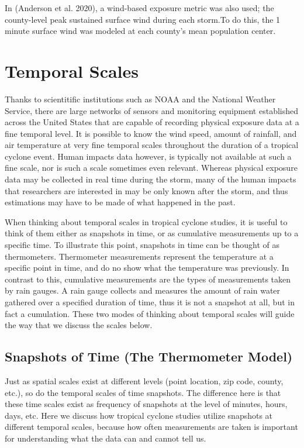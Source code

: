 \documentclass[
]{article}
\begin{document}
In (Anderson et al. 2020), a wind-based exposure metric was also used;
the county-level peak sustained surface wind during each storm.To do
this, the 1 minute surface wind was modeled at each county's mean
population center.

\hypertarget{temporal-scales}{%
\section{Temporal Scales}\label{temporal-scales}}

Thanks to scientitific institutions such as NOAA and the National
Weather Service, there are large networks of sensors and monitoring
equipment established across the United States that are capable of
recording physical exposure data at a fine temporal level. It is
possible to know the wind speed, amount of rainfall, and air temperature
at very fine temporal scales throughout the duration of a tropical
cyclone event. Human impacts data however, is typically not available at
such a fine scale, nor is such a scale sometimes even relevant. Whereas
physical exposure data may be collected in real time during the storm,
many of the human impacts that researchers are interested in may be only
known after the storm, and thus estimations may have to be made of what
happened in the past.

When thinking about temporal scales in tropical cyclone studies, it is
useful to think of them either as snapshots in time, or as cumulative
measurements up to a specific time. To illustrate this point, snapshots
in time can be thought of as thermometers. Thermometer measurements
represent the temperature at a specific point in time, and do no show
what the temperature was previously. In contrast to this, cumulative
measurements are the types of measurements taken by rain gauges. A rain
gauge collects and measures the amount of rain water gathered over a
specified duration of time, thus it is not a snapshot at all, but in
fact a cumulation. These two modes of thinking about temporal scales
will guide the way that we discuss the scales below.

\hypertarget{snapshots-of-time-the-thermometer-model}{%
\subsection{Snapshots of Time (The Thermometer
Model)}\label{snapshots-of-time-the-thermometer-model}}

Just as spatial scales exist at different levels (point location, zip
code, county, etc.), so do the temporal scales of time snapshots. The
difference here is that these time scales exist as frequency of
snapshots at the level of minutes, hours, days, etc. Here we discuss how
tropical cyclone studies utilize snapshots at different temporal scales,
because how often measurements are taken is important for understanding
what the data can and cannot tell us.
\end{document}
